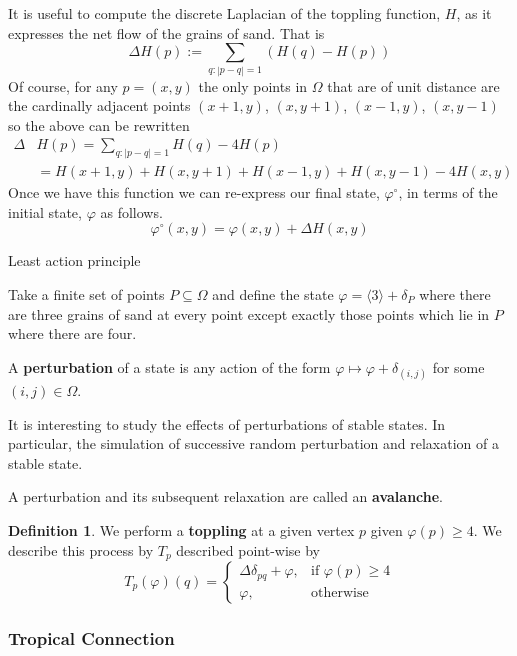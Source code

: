 \documentclass[12pt,a4paper]{amsart}
\theoremstyle{definition}
\newtheorem{defn}{Definition}[section]
\theoremstyle{remark}
\begin{document}
It is useful to compute the discrete Laplacian of the toppling function, $H$, as it expresses the net flow of the grains of sand. That is
\begin{equation}
    \Delta H(p) := \sum_{q:|p-q|=1}(H(q)-H(p))
\end{equation}
Of course, for any $p=(x,y)$ the only points in $\Omega$ that are of unit distance are the cardinally adjacent points $(x+1,y)$, $(x,y+1)$, $(x-1,y)$, $(x,y-1)$ so the above can be rewritten
\begin{align*}
    \Delta& H(p) = \sum_{q:|p-q|=1}H(q) - 4H(p)\\
    &= H(x+1,y) + H(x,y+1) + H(x-1,y) + H(x,y-1) - 4H(x,y)
\end{align*}
Once we have this function we can re-express our final state, $\varphi^\circ$, in terms of the initial state, $\varphi$ as follows.
\begin{equation}
    \varphi^\circ(x,y) = \varphi(x,y) + \Delta H(x,y)
\end{equation}

Least action principle

\ex
Take a finite set of points $P\subseteq\Omega$ and define the state $\varphi=\langle3\rangle+\delta_P$ where there are three grains of sand at every point except exactly those points which lie in $P$ where there are four.

A \textbf{perturbation} of a state is any action of the form $\varphi \mapsto \varphi + \delta_{(i,j)}$ for some $(i,j)\in\Omega$.

It is interesting to study the effects of perturbations of stable states. In particular, the simulation of successive random perturbation and relaxation of a stable state.

A perturbation and its subsequent relaxation are called an \textbf{avalanche}.

\begin{defn}
We perform a \textbf{toppling} at a given vertex $p$ given $\varphi(p) \geq 4$. We describe this process by $T_p$ described point-wise by
\begin{equation}
    T_p(\varphi)(q) =
    \begin{cases}
    \Delta\delta_{p q} + \varphi,& \text{if }\varphi(p) \geq 4\\
    \varphi,& \text{otherwise}
    \end{cases}
\end{equation}
\end{defn}

\subsubsection{Tropical Connection}
\end{document}
